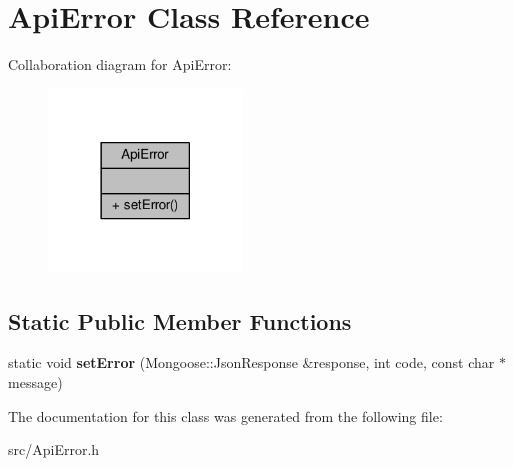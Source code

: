 \hypertarget{classApiError}{}\section{Api\+Error Class Reference}
\label{classApiError}


Collaboration diagram for Api\+Error\+:\nopagebreak
\begin{figure}[H]
\begin{center}
\leavevmode
\includegraphics[width=146pt]{db/d7a/classApiError__coll__graph}
\end{center}
\end{figure}
\subsection*{Static Public Member Functions}
\begin{DoxyCompactItemize}
\item 
static void {\bfseries set\+Error} (Mongoose\+::\+Json\+Response \&response, int code, const char $\ast$message)\hypertarget{classApiError_af651e18e1e3eb63f1abadb5a1a9e7676}{}\label{classApiError_af651e18e1e3eb63f1abadb5a1a9e7676}

\end{DoxyCompactItemize}


The documentation for this class was generated from the following file\+:\begin{DoxyCompactItemize}
\item 
src/Api\+Error.\+h\end{DoxyCompactItemize}
